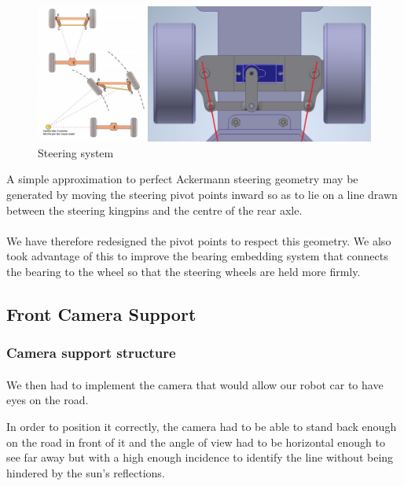 \begin{figure}[!ht]
    \begin{center}
        \includegraphics[scale=0.45]{Images/steering.jpg}
    \end{center}
    \caption{Steering system}
    \label{fig:raspi_config}
\end{figure}

A simple approximation to perfect Ackermann steering geometry may be generated by
moving the steering pivot points inward so as to lie on a line drawn between the
steering kingpins and the centre of the rear axle.

\paragraph{}
We have therefore redesigned the pivot points to respect this geometry. We also
took advantage of this to improve the bearing embedding system that connects the
bearing to the wheel so that the steering wheels are held more firmly.

\subsection{Front Camera Support}

\subsubsection{Camera support structure}
\paragraph{}
We then had to implement the camera that would allow our robot car to have eyes
on the road.

In order to position it correctly, the camera had to be able to stand back enough
on the road in front of it and the angle of view had to be horizontal enough to see
far away but with a high enough incidence to identify the line without being
hindered by the sun's reflections.

